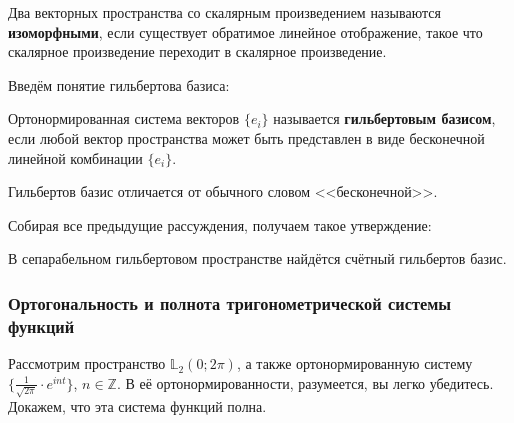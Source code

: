 \documentclass[12pt]{article}
\begin{document}
			\begin{defi}
				Два векторных пространства со скалярным произведением называются 
				\textbf{изоморфными}, если существует обратимое линейное отображение, 
				такое что скалярное произведение переходит в скалярное произведение.
			\end{defi}
	
			Введём понятие гильбертова базиса:
			\begin{defi}
				Ортонормированная система векторов $\{ e_i \}$ называется \textbf{гильбертовым базисом}, если
				любой вектор
				пространства может быть представлен в виде бесконечной линейной комбинации $ \{ e_i \} $.
			\end{defi}
	
			{\color{gray} Гильбертов базис отличается от обычного словом <<бесконечной>>.}

			Собирая все предыдущие рассуждения, получаем такое утверждение:

			\begin{state}
				В сепарабельном гильбертовом пространстве найдётся счётный гильбертов базис.
			\end{state}

		\subsubsection{Ортогональность и полнота тригонометрической системы функций}


			Рассмотрим пространство $\mathbb{L}_2 (0; 2\pi)$, а также ортонормированную систему $\{ \frac{1}{\sqrt{2\pi}} \cdot e^{int} \}$, $n \in \mathbb{Z}$. {\color{gray} В её ортонормированности, разумеется, вы легко убедитесь.} Докажем, что эта система функций полна.
\end{document}
